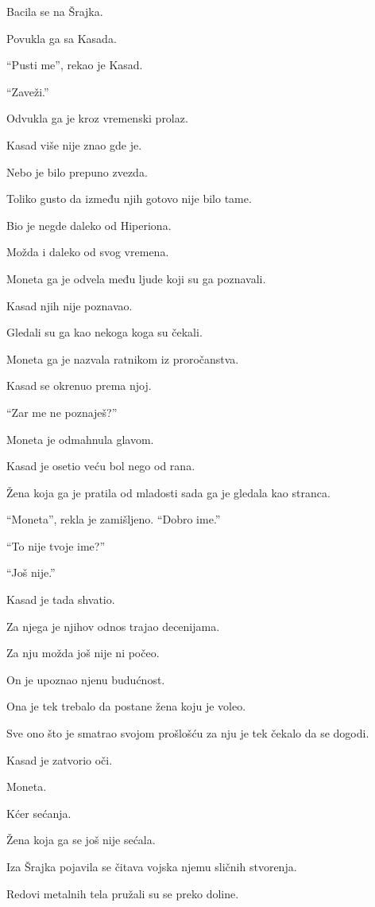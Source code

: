 Bacila se na Šrajka.

Povukla ga sa Kasada.

``Pusti me'', rekao je Kasad.

``Zaveži.''

Odvukla ga je kroz vremenski prolaz.

\bigskip

Kasad više nije znao gde je.

Nebo je bilo prepuno zvezda.

Toliko gusto da između njih gotovo nije bilo tame.

Bio je negde daleko od Hiperiona.

Možda i daleko od svog vremena.

Moneta ga je odvela među ljude koji su ga poznavali.

Kasad njih nije poznavao.

Gledali su ga kao nekoga koga su čekali.

Moneta ga je nazvala ratnikom iz proročanstva.

Kasad se okrenuo prema njoj.

``Zar me ne poznaješ?''

Moneta je odmahnula glavom.

Kasad je osetio veću bol nego od rana.

Žena koja ga je pratila od mladosti sada ga je gledala kao stranca.

``Moneta'', rekla je zamišljeno. ``Dobro ime.''

``To nije tvoje ime?''

``Još nije.''

Kasad je tada shvatio.

Za njega je njihov odnos trajao decenijama.

Za nju možda još nije ni počeo.

On je upoznao njenu budućnost.

Ona je tek trebalo da postane žena koju je voleo.

Sve ono što je smatrao svojom prošlošću za nju je tek čekalo da se dogodi.

Kasad je zatvorio oči.

Moneta.

Kćer sećanja.

Žena koja ga se još nije sećala.

\bigskip

Iza Šrajka pojavila se čitava vojska njemu sličnih stvorenja.

Redovi metalnih tela pružali su se preko doline.

